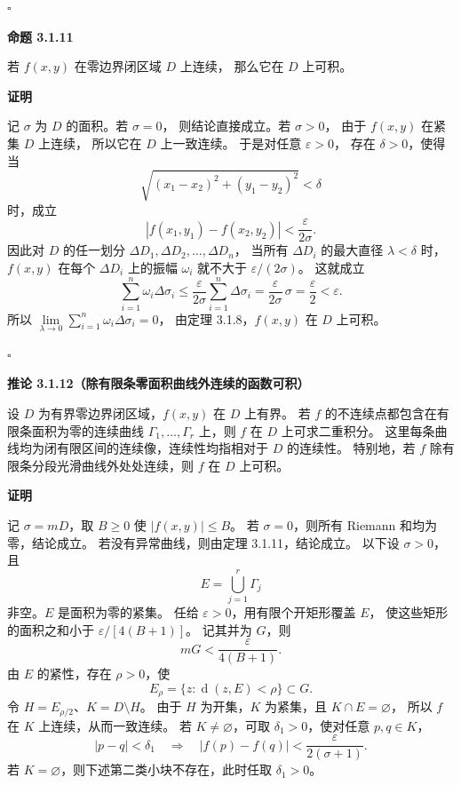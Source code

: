 $\square$





\textbf{命题 3.1.11}

若 $f(x,y)$ 在零边界闭区域 $D$ 上连续，
那么它在 $D$ 上可积。





\textbf{证明}

记 $\sigma$ 为 $D$ 的面积。若 $\sigma=0$，
则结论直接成立。若 $\sigma>0$，
由于 $f(x,y)$ 在紧集 $D$ 上连续，
所以它在 $D$ 上一致连续。
于是对任意 $\varepsilon>0$，
存在 $\delta>0$，使得当
\[
\sqrt{(x_1-x_2)^2+(y_1-y_2)^2}<\delta
\]
时，成立
\[
|f(x_1,y_1)-f(x_2,y_2)|<\frac{\varepsilon}{2\sigma}.
\]
因此对 $D$ 的任一划分
$\Delta D_1,\Delta D_2,\ldots,\Delta D_n$，
当所有 $\Delta D_i$ 的最大直径 $\lambda<\delta$ 时，
$f(x,y)$ 在每个 $\Delta D_i$ 上的振幅
$\omega_i$ 就不大于 $\varepsilon/(2\sigma)$。
这就成立
\[
\sum_{i=1}^n\omega_i\Delta\sigma_i
\le\frac{\varepsilon}{2\sigma}
\sum_{i=1}^n\Delta\sigma_i
=\frac{\varepsilon}{2\sigma}\,\sigma
=\frac{\varepsilon}{2}<\varepsilon.
\]
所以
$\lim\limits_{\lambda\to0}\sum_{i=1}^n\omega_i\Delta\sigma_i=0$，
由定理 3.1.8，$f(x,y)$ 在 $D$ 上可积。


$\square$





\textbf{推论 3.1.12（除有限条零面积曲线外连续的函数可积）}


设 $D$ 为有界零边界闭区域，$f(x,y)$ 在 $D$ 上有界。
若 $f$ 的不连续点都包含在有限条面积为零的连续曲线
$\Gamma_1,\ldots,\Gamma_r$ 上，则 $f$ 在 $D$ 上可求二重积分。
这里每条曲线均为闭有限区间的连续像，连续性均指相对于 $D$ 的连续性。
特别地，若 $f$ 除有限条分段光滑曲线外处处连续，则 $f$ 在 $D$ 上可积。





\textbf{证明}

记 $\sigma=mD$，取 $B\ge0$ 使 $|f(x,y)|\le B$。
若 $\sigma=0$，则所有 Riemann 和均为零，结论成立。
若没有异常曲线，则由定理 3.1.11，结论成立。
以下设 $\sigma>0$，且
\[
E=\bigcup_{j=1}^r\Gamma_j
\]
非空。$E$ 是面积为零的紧集。
任给 $\varepsilon>0$，用有限个开矩形覆盖 $E$，
使这些矩形的面积之和小于 $\varepsilon/[4(B+1)]$。
记其并为 $G$，则
\[
mG<\frac{\varepsilon}{4(B+1)}.
\]
由 $E$ 的紧性，存在 $\rho>0$，使
\[
E_\rho=\{z:\operatorname{d}(z,E)<\rho\}\subset G.
\]
令 $H=E_{\rho/2}$、$K=D\setminus H$。
由于 $H$ 为开集，$K$ 为紧集，且 $K\cap E=\varnothing$，
所以 $f$ 在 $K$ 上连续，从而一致连续。
若 $K\ne\varnothing$，可取 $\delta_1>0$，使对任意 $p,q\in K$，
\[
|p-q|<\delta_1
\quad\Longrightarrow\quad
|f(p)-f(q)|<\frac{\varepsilon}{2(\sigma+1)}.
\]
若 $K=\varnothing$，则下述第二类小块不存在，此时任取 $\delta_1>0$。

